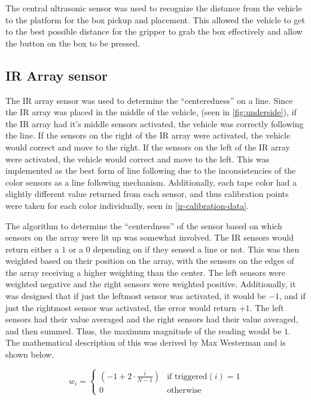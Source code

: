 \documentclass[11pt]{report}
\begin{document}
\par The central ultrasonic sensor was used to recognize the distance from the vehicle to the platform for the box pickup and placement. This allowed the vehicle to get to the best possible distance for the gripper to grab the box effectively and allow the button on the box to be pressed.

\subsection{IR Array sensor}
The \gls{IR} array sensor was used to determine the ``centeredness'' on a line. Since the \gls{IR} array was placed in the middle of the vehicle, (seen in \cref{fig:underside}), if the \gls{IR} array had it's middle sensors activated, the vehicle was correctly following the line. If the sensors on the right of the \gls{IR} array were activated, the vehicle would correct and move to the right. If the sensors on the left of the \gls{IR} array were activated, the vehicle would correct and move to the left. This was implemented as the best form of line following due to the inconsistencies of the color sensors as a line following mechanism. Additionally, each tape color had a slightly different value returned from each sensor, and thus calibration points were taken for each color individually, seen in \cref{ir-calibration-data}.

\par The algorithm to determine the ``centerdness'' of the sensor based on which sensors on the array were lit up was somewhat involved. The \gls{IR} sensors would return either a $1$ or a $0$ depending on if they sensed a line or not. This was then weighted based on their position on the array, with the sensors on the edges of the array receiving a higher weighting than the center. The left sensors were weighted negative and the right sensors were weighted positive. Additionally, it was designed that if just the leftmost sensor was activated, it would be $-1$, and if just the rightmost sensor was activated, the error would return $+1$. The left sensors had their value averaged and the right sensors had their value averaged, and then summed. Thus, the maximum magnitude of the reading would be $1$. The mathematical description of this was derived by Max Westerman and is shown below.

\[
w_i = \begin{cases} 
  (-1 + 2 \cdot \frac{i}{N-1}) & \text{if triggered}(i) = 1 \\
  0 & \text{otherwise}
\end{cases}
\]
\end{document}
